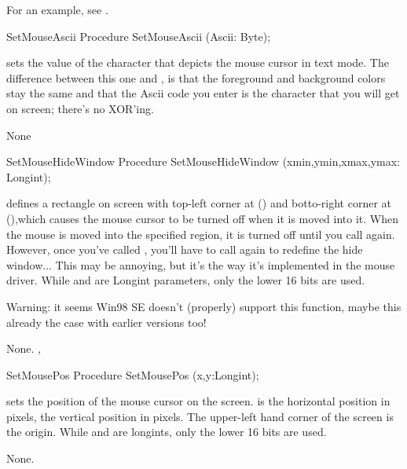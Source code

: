 For an example, see .
\begin{procedure}{SetMouseAscii}
\Declaration
Procedure SetMouseAscii (Ascii: Byte);

\Description

sets the  value of the character that depicts the mouse cursor in 
text mode.
The difference between this one and , is that the foreground
and background colors stay the same and that the Ascii code you enter is the
character that you will get on screen; there's no XOR'ing.

\Errors
None
\SeeAlso
{}
\end{procedure}
\latex{}
\html{}
\begin{procedure}{SetMouseHideWindow}
\Declaration
Procedure SetMouseHideWindow (xmin,ymin,xmax,ymax: Longint);

\Description

defines a rectangle on screen with top-left corner at () and
botto-right corner at (),which causes the mouse cursor to be 
turned off when it is moved into it.
When the mouse is moved into the specified region, it is turned off until you
call  again. However, once you've called , you'll have to
call  again to redefine the hide window... 
This may be annoying, but it's the way it's implemented in the mouse driver.
While  and  are Longint parameters, 
only the lower 16 bits are used.

Warning: it seems Win98 SE doesn't (properly) support this function,
maybe this already the case with earlier versions too!

\Errors
None.
\SeeAlso
{}, 
\end{procedure}
\html{}
\begin{procedure}{SetMousePos}
\Declaration
Procedure SetMousePos (x,y:Longint);

\Description

 sets the position of the mouse cursor on the screen.
 is the horizontal position in pixels,  the vertical position
in pixels. The upper-left hand corner of the screen is the origin.
While  and  are longints, only the lower 16 bits are used.

\Errors
None.
\SeeAlso
{}
\end{procedure}
